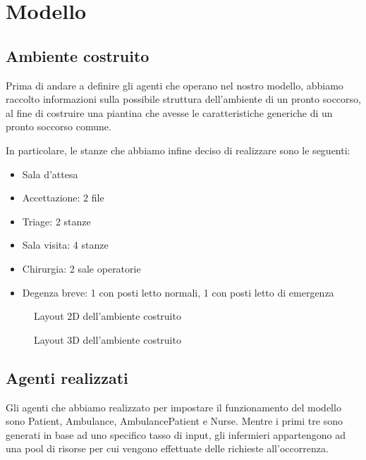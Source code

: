 \chapter{Modello}

\section{Ambiente costruito}

Prima di andare a definire gli agenti che operano nel nostro modello, abbiamo raccolto informazioni sulla possibile struttura dell'ambiente di un pronto soccorso, al fine di costruire una piantina che avesse le caratteristiche generiche di un pronto soccorso comune. 

In particolare, le stanze che abbiamo infine deciso di realizzare sono le seguenti: 
\begin{itemize}
    \item Sala d'attesa
    \item Accettazione: 2 file
    \item Triage: 2 stanze
    \item Sala visita: 4 stanze
    \item Chirurgia: 2 sale operatorie
    \item Degenza breve: 1 con posti letto normali, 1 con posti letto di emergenza
\end{itemize}

\begin{figure}[!htb]
    \centering
    \caption{Layout 2D dell'ambiente costruito}
    \label{fig:layout}
\end{figure}
\begin{figure}[!htb]
    \centering
    \caption{Layout 3D dell'ambiente costruito}
    \label{fig:layout3D}
\end{figure}

\section{Agenti realizzati}

Gli agenti che abbiamo realizzato per impostare il funzionamento del modello sono Patient, Ambulance, AmbulancePatient e Nurse. 
Mentre i primi tre sono generati in base ad uno specifico tasso di input, gli infermieri appartengono ad una pool di risorse per cui vengono effettuate delle richieste all'occorrenza.

